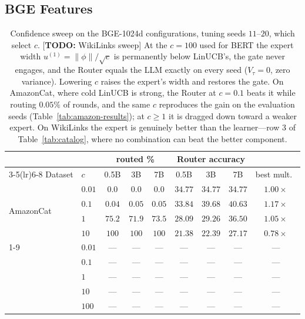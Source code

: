\documentclass{article}
\theoremstyle{definition}
\theoremstyle{remark}
\theoremstyle{remark}
\newcommand{\todo}[1]{\textcolor{red!70!black}{[\textbf{TODO:} #1]}}
\begin{document}
\subsection{BGE Features}
\label{app:bge}

\begin{table}[h]
\centering
\caption{Confidence sweep on the BGE-1024d configurations, tuning seeds
$11$--$20$, which select $c$. \todo{WikiLinks sweep} At the
$c=100$ used for BERT the expert width $u^{(1)}=\|\phi\|/\sqrt c$ is
permanently below LinUCB's, the gate never engages, and the Router equals the
LLM exactly on every seed ($V_\tau=0$, zero variance). Lowering $c$ raises the
expert's width and restores the gate. On AmazonCat, where cold LinUCB is
strong, the Router at $c=0.1$ beats it while routing $0.05\%$ of rounds, and
the same $c$ reproduces the gain on the evaluation seeds
(Table~\ref{tab:amazon-results}); at $c\ge1$ it is dragged down toward a
weaker expert. On WikiLinks the expert is
genuinely better than the learner---row 3 of Table~\ref{tab:catalog}, where no
combination can beat the better component.}
\label{tab:bge-csweep}
\scriptsize
\setlength{\tabcolsep}{4pt}
\begin{tabular}{@{}llccccccc@{}}
\toprule
& & \multicolumn{3}{c}{routed \%} & \multicolumn{3}{c}{Router accuracy} & \\
\cmidrule(lr){3-5}\cmidrule(lr){6-8}
Dataset & $c$ & 0.5B & 3B & 7B & 0.5B & 3B & 7B & best mult.\ \\
\midrule
\multirow{4}{*}{AmazonCat} & $0.01$ & $0.0$ & $0.0$ & $0.0$ & $34.77$ & $34.77$ & $34.77$ & $1.00\times$ \\
 & $\mathbf{0.1}$ & $0.04$ & $0.05$ & $0.05$ & $33.84$ & $39.68$ & $\mathbf{40.63}$ & $\mathbf{1.17\times}$ \\
 & $1$  & $75.2$ & $71.9$ & $73.5$ & $28.09$ & $29.26$ & $36.50$ & $1.05\times$ \\
 & $10$ & $100$ & $100$ & $100$ & $21.38$ & $22.39$ & $27.17$ & $0.78\times$ \\
\cmidrule(lr){1-9}
\multirow{5}{*}{WikiLinks} & $0.01$ & --- & --- & --- & --- & --- & --- & --- \\
 & $0.1$ & --- & --- & --- & --- & --- & --- & --- \\
 & $1$  & --- & --- & --- & --- & --- & --- & --- \\
 & $10$ & --- & --- & --- & --- & --- & --- & --- \\
 & $100$ & --- & --- & --- & --- & --- & --- & --- \\
\bottomrule
\end{tabular}
\end{table}
\end{document}
